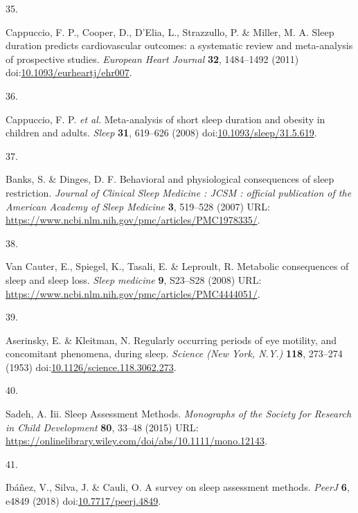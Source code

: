 \documentclass[
  10pt,
]{scrbook}
\newlength{\cslhangindent}
\newlength{\csllabelwidth}
\newlength{\cslentryspacingunit} %
\newenvironment{CSLReferences}[2] %
 {%
  \setlength{\parindent}{0pt}
  \ifodd #1
  \let\oldpar\par
  \def\par{\hangindent=\cslhangindent\oldpar}
  \fi
  \setlength{\parskip}{#2\cslentryspacingunit}
 }%
 {}
\newcommand{\CSLLeftMargin}[1]{\parbox[t]{\csllabelwidth}{#1}}
\newcommand{\CSLRightInline}[1]{\parbox[t]{\linewidth - \csllabelwidth}{#1}\break}
\begin{document}
\begin{CSLReferences}{0}{0}
\leavevmode{}%
\CSLLeftMargin{35. }%
\CSLRightInline{Cappuccio, F. P., Cooper, D., D'Elia, L., Strazzullo, P.
\& Miller, M. A. Sleep duration predicts cardiovascular outcomes: a
systematic review and meta-analysis of prospective studies.
\emph{European Heart Journal} \textbf{32}, 1484--1492 (2011)
doi:\href{https://doi.org/10.1093/eurheartj/ehr007}{10.1093/eurheartj/ehr007}.}

\leavevmode{}%
\CSLLeftMargin{36. }%
\CSLRightInline{Cappuccio, F. P. \emph{et al.} Meta-analysis of short
sleep duration and obesity in children and adults. \emph{Sleep}
\textbf{31}, 619--626 (2008)
doi:\href{https://doi.org/10.1093/sleep/31.5.619}{10.1093/sleep/31.5.619}.}

\leavevmode{}%
\CSLLeftMargin{37. }%
\CSLRightInline{Banks, S. \& Dinges, D. F. Behavioral and physiological
consequences of sleep restriction. \emph{Journal of Clinical Sleep
Medicine : JCSM : official publication of the American Academy of Sleep
Medicine} \textbf{3}, 519--528 (2007) URL:
\url{https://www.ncbi.nlm.nih.gov/pmc/articles/PMC1978335/}.}

\leavevmode{}%
\CSLLeftMargin{38. }%
\CSLRightInline{Van Cauter, E., Spiegel, K., Tasali, E. \& Leproult, R.
Metabolic consequences of sleep and sleep loss. \emph{Sleep medicine}
\textbf{9}, S23--S28 (2008) URL:
\url{https://www.ncbi.nlm.nih.gov/pmc/articles/PMC4444051/}.}

\leavevmode{}%
\CSLLeftMargin{39. }%
\CSLRightInline{Aserinsky, E. \& Kleitman, N. Regularly occurring
periods of eye motility, and concomitant phenomena, during sleep.
\emph{Science (New York, N.Y.)} \textbf{118}, 273--274 (1953)
doi:\href{https://doi.org/10.1126/science.118.3062.273}{10.1126/science.118.3062.273}.}

\leavevmode{}%
\CSLLeftMargin{40. }%
\CSLRightInline{Sadeh, A. Iii. Sleep Assessment Methods.
\emph{Monographs of the Society for Research in Child Development}
\textbf{80}, 33--48 (2015) URL:
\url{https://onlinelibrary.wiley.com/doi/abs/10.1111/mono.12143}.}

\leavevmode{}%
\CSLLeftMargin{41. }%
\CSLRightInline{Ibáñez, V., Silva, J. \& Cauli, O. A survey on sleep
assessment methods. \emph{PeerJ} \textbf{6}, e4849 (2018)
doi:\href{https://doi.org/10.7717/peerj.4849}{10.7717/peerj.4849}.}


\end{CSLReferences}
\end{document}

